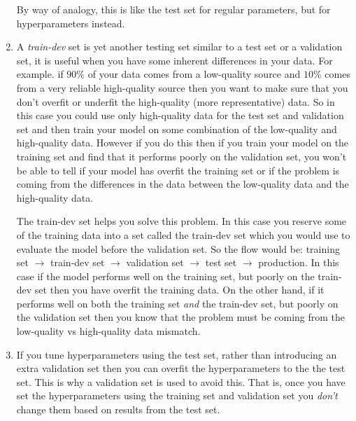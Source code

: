 \documentclass[12pt]{article}
\begin{document}
\begin{enumerate}[label=\arabic*]
        By way of analogy, this is like the test set for regular parameters, but for hyperparameters instead.
  \item A \emph{train-dev} set is yet another testing set similar to a test set or a validation set, it is useful when you have some inherent differences in your data.
        For example. if $90\%$ of your data comes from a low-quality source and $10\%$ comes from a very reliable high-quality source then you want to make sure that you don't
        overfit or underfit the high-quality (more representative) data. So in this case you could use only high-quality data for the test set and validation set and then train your model
        on some combination of the low-quality and high-quality data. However if you do this then if you train your model on the training set and find that
        it performs poorly on the validation set, you won't be able to tell if your model has overfit the training set or if the problem is coming from the differences in the data
        between the low-quality data and the high-quality data.

        The train-dev set helps you solve this problem. In this case you reserve some of the training data into a set called the train-dev set which you would use to evaluate the model before
        the validation set. So the flow would be: training set $\rightarrow$ train-dev set $\rightarrow$ validation set $\rightarrow$ test set $\rightarrow$ production. In this case if the model performs
        well on the training set, but poorly on the train-dev set then you have overfit the training data. On the other hand, if it performs well on both the training set \emph{and} the train-dev set, but
        poorly on the validation set then you know that the problem must be coming from the low-quality vs high-quality data mismatch.
  \item If you tune hyperparameters using the test set, rather than introducing an extra validation set then you can overfit the hyperparameters to the the test set. This is why
        a validation set is used to avoid this. That is, once you have set the hyperparameters using the training set and validation set you \emph{don't} change them based on results from
        the test set.
\end{enumerate}
\end{document}
